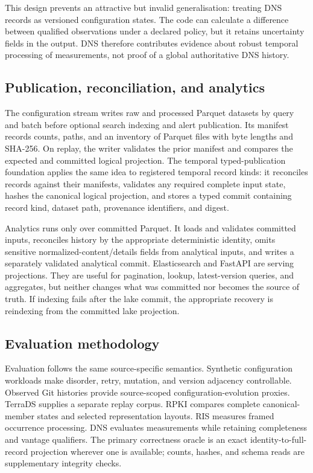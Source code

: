 \documentclass[a4paper,11pt]{article}
\begin{document}
This design prevents an attractive but invalid generalisation: treating DNS records as versioned configuration states. The code can calculate a difference between qualified observations under a declared policy, but it retains uncertainty fields in the output. DNS therefore contributes evidence about robust temporal processing of measurements, not proof of a global authoritative DNS history.

\subsection{Publication, reconciliation, and analytics}

The configuration stream writes raw and processed Parquet datasets by query and batch before optional search indexing and alert publication. Its manifest records counts, paths, and an inventory of Parquet files with byte lengths and SHA-256. On replay, the writer validates the prior manifest and compares the expected and committed logical projection. The temporal typed-publication foundation applies the same idea to registered temporal record kinds: it reconciles records against their manifests, validates any required complete input state, hashes the canonical logical projection, and stores a typed commit containing record kind, dataset path, provenance identifiers, and digest.

Analytics runs only over committed Parquet. It loads and validates committed inputs, reconciles history by the appropriate deterministic identity, omits sensitive normalized-content/details fields from analytical inputs, and writes a separately validated analytical commit. Elasticsearch and FastAPI are serving projections. They are useful for pagination, lookup, latest-version queries, and aggregates, but neither changes what was committed nor becomes the source of truth. If indexing fails after the lake commit, the appropriate recovery is reindexing from the committed lake projection.

\subsection{Evaluation methodology}

Evaluation follows the same source-specific semantics. Synthetic configuration workloads make disorder, retry, mutation, and version adjacency controllable. Observed Git histories provide source-scoped configuration-evolution proxies. TerraDS supplies a separate replay corpus. RPKI compares complete canonical-member states and selected representation layouts. RIS measures framed occurrence processing. DNS evaluates measurements while retaining completeness and vantage qualifiers. The primary correctness oracle is an exact identity-to-full-record projection wherever one is available; counts, hashes, and schema reads are supplementary integrity checks.
\end{document}
